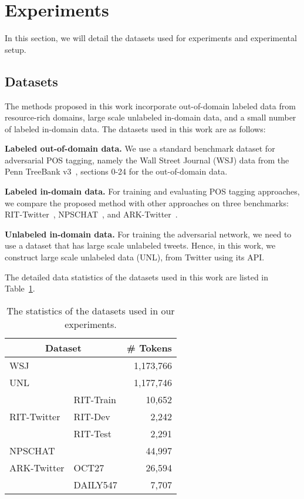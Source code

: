 \documentclass[11pt,letterpaper]{article}
\begin{document}
\section{Experiments}
In this section, we will detail the datasets used for experiments and experimental setup.

\subsection{Datasets}
The methods proposed in this work incorporate out-of-domain labeled data from resource-rich domains, large scale unlabeled in-domain data, and a small number of labeled in-domain data. The datasets used in this work are as follows:

\noindent \textbf{Labeled out-of-domain data.} We use a standard benchmark dataset for adversarial POS tagging, namely the Wall Street Journal (WSJ) data from the Penn TreeBank v3~\cite{marcus1993building}, sections 0-24 for the out-of-domain data.  

\noindent \textbf{Labeled in-domain data.} For training and evaluating POS tagging approaches, we compare the proposed method with other approaches on three benchmarks: RIT-Twitter~\cite{ritter2011named}, NPSCHAT~\cite{forsyth2007improving}, and ARK-Twitter~\cite{gimpel2011part}. 

\noindent \textbf{Unlabeled in-domain data.} For training the adversarial network, we need to use a dataset that has large scale unlabeled tweets. Hence, in this work, we construct large scale unlabeled data (UNL), from Twitter using its API.

The detailed data statistics of the datasets used in this work are listed in Table~\ref{tab2}.
\begin{table}[t]
\centering
\begin{tabular}{|l|l|r|}
\hline
  \multicolumn{2}{|c|}{\textbf{Dataset}} & \textbf{\# Tokens} \\
  \hline
  \multicolumn{2}{|l|}{WSJ} & 1,173,766 \\\hline
  \multicolumn{2}{|l|}{UNL} & 1,177,746  \\\hline
  \multirow{3}{*}{RIT-Twitter} & RIT-Train & 10,652 \\\cline{2-3}
  & RIT-Dev & 2,242 \\\cline{2-3}
  & RIT-Test & 2,291 \\\hline
  \multicolumn{2}{|l|}{NPSCHAT} & 44,997 \\\hline
  \multirow{1}{*}{ARK-Twitter} & OCT27 & 26,594 \\\cline{2-3}
  & DAILY547 & 7,707 \\
  \hline
\end{tabular}
\caption{The statistics of the datasets used in our experiments.}
  \label{tab2}
\end{table}
\end{document}

